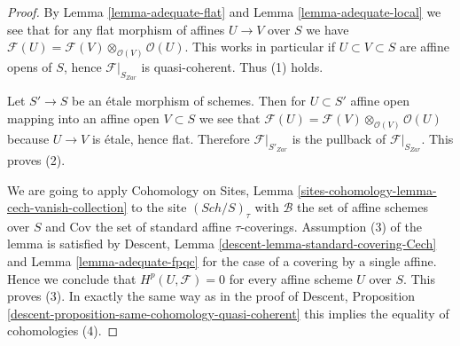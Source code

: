 \documentclass{stacks-project}
\theoremstyle{plain}
\theoremstyle{definition}
\theoremstyle{remark}
\numberwithin{equation}{subsection}
\def\Sch{\mathit{Sch}}
\begin{document}
\begin{proof}
By
Lemma \ref{lemma-adequate-flat}
and
Lemma \ref{lemma-adequate-local}
we see that for any flat morphism of affines $U \to V$ over $S$
we have
$\mathcal{F}(U) = \mathcal{F}(V) \otimes_{\mathcal{O}(V)} \mathcal{O}(U)$.
This works in particular if $U \subset V \subset S$ are affine opens of
$S$, hence $\mathcal{F}|_{S_{Zar}}$ is quasi-coherent.
Thus (1) holds.

\medskip\noindent
Let $S' \to S$ be an \'etale morphism of schemes.
Then for $U \subset S'$ affine open mapping into an affine open
$V \subset S$ we see that
$\mathcal{F}(U) = \mathcal{F}(V) \otimes_{\mathcal{O}(V)} \mathcal{O}(U)$
because $U \to V$ is \'etale, hence flat. Therefore
$\mathcal{F}|_{S'_{Zar}}$ is the pullback of $\mathcal{F}|_{S_{Zar}}$.
This proves (2).

\medskip\noindent
We are going to apply
Cohomology on Sites,
Lemma \ref{sites-cohomology-lemma-cech-vanish-collection}
to the site $(\Sch/S)_\tau$ with
$\mathcal{B}$ the set of affine schemes over $S$ and
$\text{Cov}$ the set of standard affine $\tau$-coverings.
Assumption (3) of the lemma is satisfied by
Descent, Lemma \ref{descent-lemma-standard-covering-Cech}
and
Lemma \ref{lemma-adequate-fpqc}
for the case of a covering by a single affine.
Hence we conclude that $H^p(U, \mathcal{F}) = 0$ for every
affine scheme $U$ over $S$. This proves (3).
In exactly the same way as in the proof of
Descent, Proposition \ref{descent-proposition-same-cohomology-quasi-coherent}
this implies the equality of cohomologies (4).
\end{proof}
\end{document}
